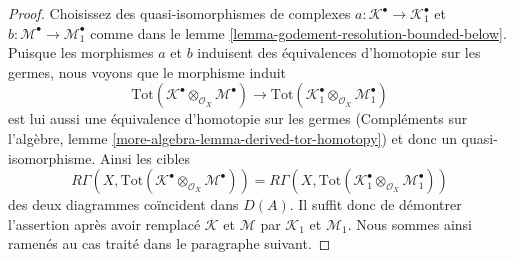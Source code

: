 {\begin{proof}

Choisissez des quasi-isomorphismes de complexes
$a : \mathcal{K}^\bullet \to \mathcal{K}_1^\bullet$ et
$b : \mathcal{M}^\bullet \to \mathcal{M}_1^\bullet$
comme dans le lemme \ref{lemma-godement-resolution-bounded-below}. Puisque les morphismes $a$ et $b$ induisent des équivalences d'homotopie sur les germes, nous voyons que le morphisme induit
$$
\text{Tot}(\mathcal{K}^\bullet \otimes_{\mathcal{O}_X} \mathcal{M}^\bullet)
\to
\text{Tot}(\mathcal{K}_1^\bullet \otimes_{\mathcal{O}_X} \mathcal{M}_1^\bullet)
$$
est lui aussi une équivalence d'homotopie sur les germes (Compléments sur l'algèbre, lemme
\ref{more-algebra-lemma-derived-tor-homotopy}) et donc un quasi-isomorphisme. Ainsi les cibles
$$
R\Gamma(X,
\text{Tot}(\mathcal{K}^\bullet
\otimes_{\mathcal{O}_X} \mathcal{M}^\bullet)) =
R\Gamma(X,
\text{Tot}(\mathcal{K}_1^\bullet
\otimes_{\mathcal{O}_X} \mathcal{M}_1^\bullet))
$$
des deux diagrammes coïncident dans $D(A)$. Il suffit donc de démontrer l'assertion après avoir remplacé $\mathcal{K}$ et $\mathcal{M}$
par $\mathcal{K}_1$ et $\mathcal{M}_1$. Nous sommes ainsi ramenés au cas traité dans le paragraphe suivant.

\medskip\noindent


\end{proof}}

